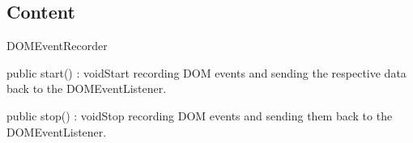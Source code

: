 \subsection{Content}
\begin{class}{DOMEventRecorder}



\begin{methods}
\begin{method}{public start() : void}{Start recording DOM events and sending the respective data back to the DOMEventListener.}
\end{method}
\begin{method}{public stop() : void}{Stop recording DOM events and sending them back to the DOMEventListener.}
\end{method}
\end{methods}
\end{class}